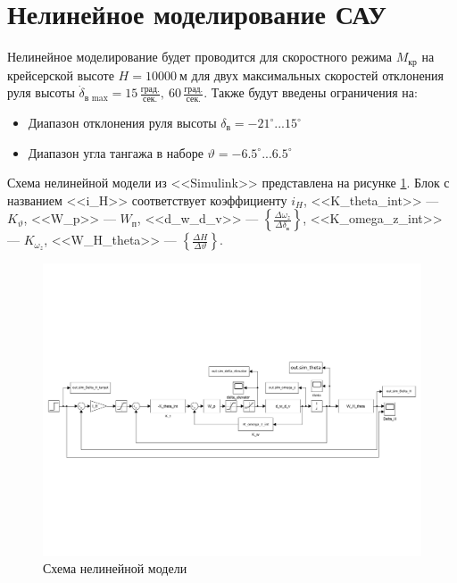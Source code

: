 \section{Нелинейное моделирование САУ}
Нелинейное моделирование будет проводится для скоростного режима $M_\text{кр}$
на крейсерской высоте $H = 10000\ \text{м}$ для двух максимальных скоростей
отклонения руля высоты $\dot{\delta}_\text{в max} = 15\, \frac{\text{град.}}{\text{сек.}},\ 60\, \frac{\text{град.}}{\text{сек.}}$. Также будут введены ограничения на:

\begin{itemize}
    \item Диапазон отклонения руля высоты $\delta_\text{в} = -21^\circ ... 15^\circ$ 
    \item Диапазон угла тангажа в наборе $\vartheta = -6.5^\circ...6.5^\circ$
\end{itemize}

Схема нелинейной модели из <<Simulink>> представлена на рисунке \ref{fig:nonlinear_model_simulink}. 
Блок с названием <<i\_H>> соответствует коэффициенту $i_H$, <<K\_theta\_int>>
---  $K_\vartheta$, <<W\_p>> --- $W_{п}$, <<d\_w\_d\_v>> --- $\left\{ \frac{\Delta
\omega_z}{\Delta \delta_{в}} \right\} $, <<K\_omega\_z\_int>> --- $K_{\omega_z}$,
<<W\_H\_theta>> --- $\left\{ \frac{\Delta H}{\Delta \vartheta} \right\} $.

\begin{figure}[H]
    \centering
    \includegraphics[clip, trim=0.4cm 6cm 0.4cm 7cm , width=1.00\textwidth]{./figures/model.pdf}
    \caption{Схема нелинейной модели}
    \label{fig:nonlinear_model_simulink}
\end{figure}

